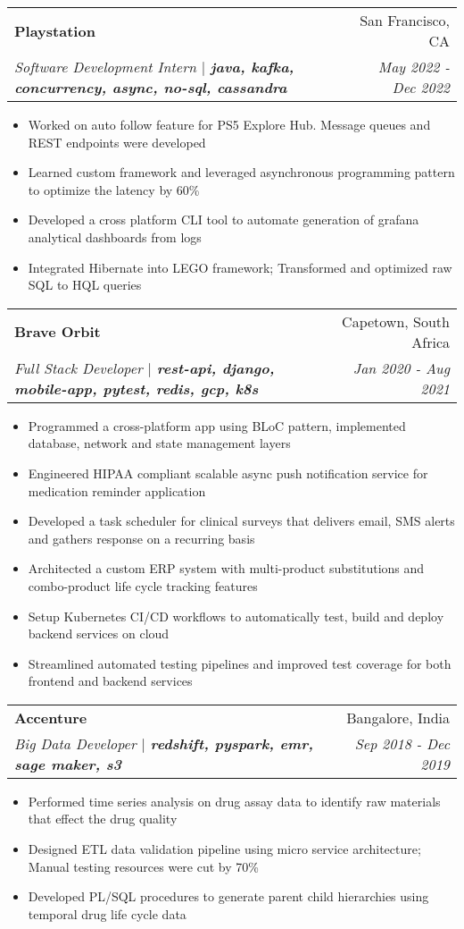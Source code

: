 \documentclass[a4paper,20pt]{article}
\makeatletter
\newcommand{\resumeItemClean}[1]{
    \item\small{
        {#1 \vspace{-2pt}}
    }
}
\newcommand{\resumeSubheading}[4]{
  \vspace{-1pt}\item
    \begin{tabular*}{0.97\textwidth}{l@{\extracolsep{\fill}}r}
      \textbf{#1} & #2 \\
      \textit{#3} & \textit{#4} \\
    \end{tabular*}\vspace{-5pt}
}
\newcommand{\resumeItemListStart}{\begin{itemize}}
\newcommand{\resumeItemListEnd}{\end{itemize}\vspace{-5pt}}
\makeatother
\begin{document}
  \resumeSubheading{Playstation}{San Francisco, CA}
    {Software Development Intern  \(|\) \textbf{java, kafka, concurrency, async, no-sql, cassandra}}{May 2022 - Dec 2022}
    \resumeItemListStart
        \resumeItemClean
        {Worked on auto follow feature for PS5 Explore Hub. Message queues and REST endpoints were developed}
        \resumeItemClean
          {Learned custom framework and leveraged asynchronous programming pattern to optimize the latency by 60\%}
        \resumeItemClean
          {Developed a cross platform CLI tool to automate generation of grafana analytical dashboards from logs}
	\resumeItemClean
	{Integrated Hibernate into LEGO framework; Transformed and optimized raw SQL to HQL queries}
        \resumeItemListEnd
        
    \resumeSubheading{Brave Orbit}{Capetown, South Africa}
    {Full Stack Developer \(|\) \textbf{rest-api, django, mobile-app, pytest, redis, gcp, k8s}}{Jan 2020 - Aug 2021}
    \resumeItemListStart
        \resumeItemClean
            {Programmed a cross-platform app using BLoC pattern, implemented database, network and state management layers}
          \resumeItemClean
            {Engineered HIPAA compliant scalable async push notification service for medication reminder application}
          \resumeItemClean
            {Developed a task scheduler for clinical surveys that delivers email, SMS alerts and gathers response on a recurring basis}
          \resumeItemClean
            {Architected a custom ERP system with multi-product substitutions and combo-product life cycle tracking features}
          \resumeItemClean
            {Setup Kubernetes CI/CD workflows to automatically test, build and deploy backend services on cloud}
          \resumeItemClean
            {Streamlined automated testing pipelines and improved test coverage for both frontend and backend services}
    \resumeItemListEnd
      
    \resumeSubheading{Accenture}{Bangalore, India}
    {Big Data Developer \(|\) \textbf{redshift, pyspark, emr, sage maker, s3}}{Sep 2018 - Dec 2019}
    \resumeItemListStart
        \resumeItemClean
          {Performed time series analysis on drug assay data to identify raw materials that effect the drug quality}
        \resumeItemClean
          {Designed ETL data validation pipeline using micro service architecture; Manual testing resources were cut by 70\%}
        \resumeItemClean
          {Developed PL/SQL procedures to generate parent child hierarchies using temporal drug life cycle data}
        \resumeItemListEnd
\end{document}

